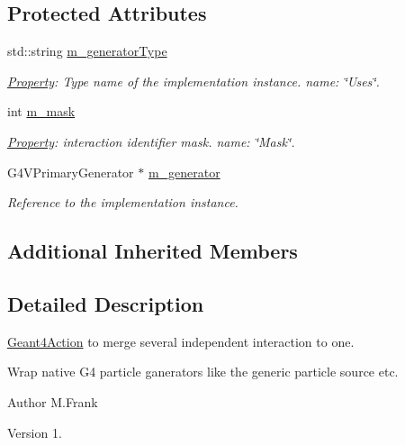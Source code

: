 \subsection*{Protected Attributes}
\begin{DoxyCompactItemize}
\item 
std\+::string \hyperlink{class_d_d4hep_1_1_simulation_1_1_geant4_generator_wrapper_aa1ee2aa3cf2f158fe49c786af37b46f0}{m\+\_\+generator\+Type}
\begin{DoxyCompactList}\small\item\em \hyperlink{class_d_d4hep_1_1_property}{Property}\+: Type name of the implementation instance. name\+: \char`\"{}\+Uses\char`\"{}. \end{DoxyCompactList}\item 
int \hyperlink{class_d_d4hep_1_1_simulation_1_1_geant4_generator_wrapper_a92bb07f3c2f7c34dc8f55290716c64b1}{m\+\_\+mask}
\begin{DoxyCompactList}\small\item\em \hyperlink{class_d_d4hep_1_1_property}{Property}\+: interaction identifier mask. name\+: \char`\"{}\+Mask\char`\"{}. \end{DoxyCompactList}\item 
G4\+V\+Primary\+Generator $\ast$ \hyperlink{class_d_d4hep_1_1_simulation_1_1_geant4_generator_wrapper_a53d604d0f487a3be2edbe9670d0d4f15}{m\+\_\+generator}
\begin{DoxyCompactList}\small\item\em Reference to the implementation instance. \end{DoxyCompactList}\end{DoxyCompactItemize}
\subsection*{Additional Inherited Members}


\subsection{Detailed Description}
\hyperlink{class_d_d4hep_1_1_simulation_1_1_geant4_action}{Geant4\+Action} to merge several independent interaction to one. 

Wrap native G4 particle ganerators like the generic particle source etc.

\begin{DoxyAuthor}{Author}
M.\+Frank 
\end{DoxyAuthor}
\begin{DoxyVersion}{Version}
1. 
\end{DoxyVersion}


